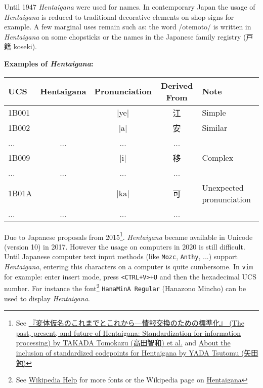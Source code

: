 Until 1947 \textit{Hentaigana} were used for names. In contemporary Japan the
usage of \textit{Hentaigana} is reduced to traditional decorative elements on
shop signs for example. A few marginal uses remain such as: the word /otemoto/
is written in \textit{Hentaigana} on some chopsticks or the names in the
Japanese family registry (戸籍 koseki).

\bigskip

\textbf{Examples of \textit{Hentaigana}:}

\begin{center}
\JapaneseFontN
\begin{tabular}{lcccl}
\textbf{UCS}&\textbf{Hentaigana}&\textbf{Pronunciation}&\textbf{Derived From}&\textbf{Note} \\\hline
1B001& 𛀁 & |ye|& 江  & Simple \\
1B002& 𛀂 & |a| & 安  & Similar \\
...  &... &...  &...  & \\
1B009& 𛀉   & |i|  & 移  & Complex \\
...  &... &...  &...  & \\
1B01A& 𛀚 &|ka| & 可  & Unexpected pronunciation \\
...  &... &...  &...  & \\
\end{tabular}
\JapaneseDefault
\end{center}

Due to Japanese proposals from 2015\footnote{See
\href{http://www.unicode.org/L2/L2015/15316-hentaigana-58_438.pdf}{『変体仮名のこれまでとこれから—情報交換のための標準化』
(The past, present, and future of Hentaigana: Standardization for information
processing) by TAKADA Tomokazu (高田智和) et al.} and
\href{http://www.unicode.org/L2/L2015/15318-hentaigana.pdf}{About the inclusion
of standardized codepoints for Hentaigana by YADA Tsutomu (矢田勉)} }.
\textit{Hentaigana} became available in Unicode (version 10) in 2017. However
the usage on computers in 2020 is still difficult. Until Japanese computer text
input methods (like \texttt{Mozc}, \texttt{Anthy}, ...) support
\textit{Hentaigana}, entering this characters on a computer is quite
cumbersome. In \texttt{vim} for example: enter insert mode, press
\texttt{<CTRL+V>+U} and then the hexadecimal UCS number. For instance the
font\footnote{See
\href{https://en.wikipedia.org/wiki/Help:Multilingual_support\#Hentaigana}{Wikipedia
Help} for more fonts or the Wikipedia page on
\href{https://en.wikipedia.org/wiki/Hentaigana}{Hentaigana} } \texttt{HanaMinA
Regular} (Hanazono Mincho) can be used to display \textit{Hentaigana}.
